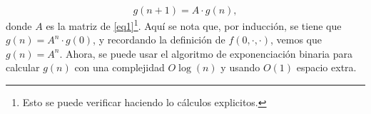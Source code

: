 \documentclass{article}
\begin{document}
    \begin{equation}\label{eq3}
        g(n+1)=A\cdot g(n),
    \end{equation}
    donde \(A\) es la matriz de \eqref{eq1}\footnote{Esto se puede verificar haciendo lo cálculos explicitos.}. Aquí se nota que, por inducción, se tiene que \(g(n)=A^n\cdot g(0)\), y recordando la definición de \(f(0,\cdot,\cdot)\), vemos que \(g(n)=A^n\). Ahora, se puede usar el algoritmo de exponenciación binaria para calcular \(g(n)\) con una complejidad \(O\log(n)\) y usando \(O(1)\) espacio extra.
\end{document}
